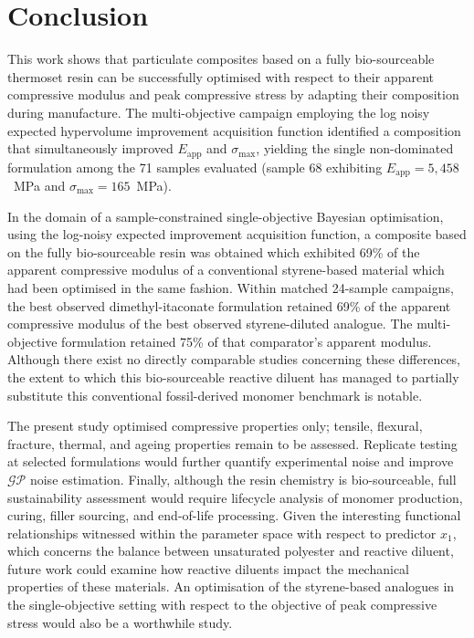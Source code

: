 \section{Conclusion}
This work shows that particulate composites based on a fully bio-sourceable
 thermoset resin can be successfully optimised with respect to their apparent
 compressive modulus and peak compressive stress by adapting their composition 
 during manufacture.
The multi-objective campaign employing the log noisy expected hypervolume
 improvement acquisition function identified a composition that simultaneously
 improved \(E_{\text{app}}\) and \(\sigma_{\text{max}}\), yielding the single
 non-dominated formulation among the 71 samples evaluated
 (sample 68 exhibiting \(E_{\text{app}}=5,458\)~\unit{\mega\pascal} and 
 \(\sigma_{\text{max}}=165\)~\unit{\mega\pascal}).

In the domain of a sample-constrained single-objective Bayesian optimisation,
 using the log-noisy expected improvement acquisition function,
 a composite based on the fully bio-sourceable resin was obtained which exhibited
  69\% of the apparent compressive modulus of a conventional styrene-based 
  material which had been optimised in the same fashion.
Within matched 24-sample campaigns, the best observed dimethyl-itaconate
 formulation retained 69\% of the apparent compressive modulus of the best 
 observed styrene-diluted analogue.
The multi-objective formulation retained 75\% of that comparator's apparent
modulus.
Although there exist no directly comparable studies concerning these
 differences, the extent to which this bio-sourceable reactive diluent
 has managed to partially substitute this conventional fossil-derived
 monomer benchmark is notable.

The present study optimised compressive properties only; tensile, flexural,
 fracture, thermal, and ageing properties remain to be assessed.
Replicate testing at selected formulations would further quantify
 experimental noise and improve \(\mathcal{GP}\) noise estimation.
Finally, although the resin chemistry is bio-sourceable, full sustainability
 assessment would require lifecycle analysis of monomer production, curing,
 filler sourcing, and end-of-life processing.
Given the interesting functional relationships witnessed within the parameter
 space with respect to predictor \(x_{1}\), which concerns the balance between
 unsaturated polyester and reactive diluent, future work could examine how
 reactive diluents impact the mechanical properties of these
 materials.
An optimisation of the styrene-based analogues in the single-objective setting
 with respect to the objective of peak compressive stress would also be a 
 worthwhile study.